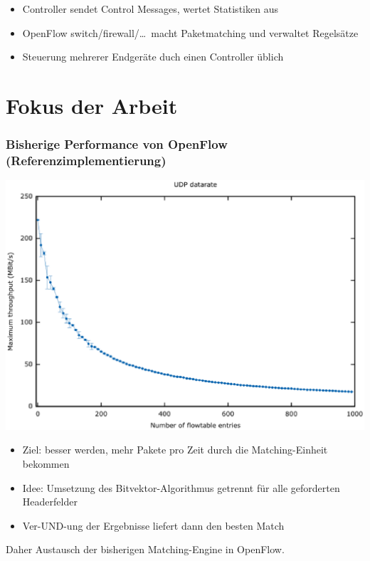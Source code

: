\documentclass{beamer}
\begin{document}
\begin{frame}
    \begin{itemize}
        \item Controller sendet Control Messages, wertet Statistiken aus
        \item OpenFlow switch/firewall/\dots\ macht Paketmatching und verwaltet Regelsätze
        \item Steuerung mehrerer Endgeräte duch einen Controller üblich
    \end{itemize}
\end{frame}

\section{Fokus der Arbeit}
\begin{frame}
\frametitle{Bisherige Performance von OpenFlow (Referenzimplementierung)}
\begin{center}
\includegraphics[height=0.7\textheight]{img/test_initial_long.eps}
\end{center}
\end{frame}

\begin{frame}
\begin{itemize}
    \item Ziel: besser werden, mehr Pakete pro Zeit durch die Matching-Einheit bekommen
    \item Idee: Umsetzung des Bitvektor-Algorithmus getrennt für alle geforderten Headerfelder
    \item Ver-UND-ung der Ergebnisse liefert dann den besten Match
\end{itemize}
Daher Austausch der bisherigen Matching-Engine in OpenFlow.
\end{frame}
\end{document}
